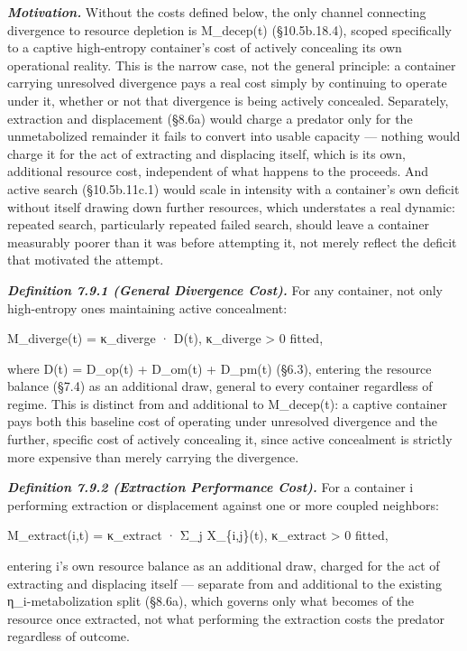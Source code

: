 \documentclass[
]{article}
\begin{document}
\emph{\textbf{Motivation.}} Without the costs defined below, the only
channel connecting divergence to resource depletion is M\_decep(t)
(§10.5b.18.4), scoped specifically to a captive high-entropy container's
cost of actively concealing its own operational reality. This is the
narrow case, not the general principle: a container carrying unresolved
divergence pays a real cost simply by continuing to operate under it,
whether or not that divergence is being actively concealed. Separately,
extraction and displacement (§8.6a) would charge a predator only for the
unmetabolized remainder it fails to convert into usable capacity ---
nothing would charge it for the act of extracting and displacing itself,
which is its own, additional resource cost, independent of what happens
to the proceeds. And active search (§10.5b.11c.1) would scale in
intensity with a container's own deficit without itself drawing down
further resources, which understates a real dynamic: repeated search,
particularly repeated failed search, should leave a container measurably
poorer than it was before attempting it, not merely reflect the deficit
that motivated the attempt.

\emph{\textbf{Definition 7.9.1 (General Divergence Cost).}} For any
container, not only high-entropy ones maintaining active concealment:

M\_diverge(t) = κ\_diverge · D(t), κ\_diverge \textgreater{} 0 fitted,

where D(t) = D\_op(t) + D\_om(t) + D\_pm(t) (§6.3), entering the
resource balance (§7.4) as an additional draw, general to every
container regardless of regime. This is distinct from and additional to
M\_decep(t): a captive container pays both this baseline cost of
operating under unresolved divergence and the further, specific cost of
actively concealing it, since active concealment is strictly more
expensive than merely carrying the divergence.

\emph{\textbf{Definition 7.9.2 (Extraction Performance Cost).}} For a
container i performing extraction or displacement against one or more
coupled neighbors:

M\_extract(i,t) = κ\_extract · Σ\_j X\_\{i,j\}(t), κ\_extract
\textgreater{} 0 fitted,

entering i's own resource balance as an additional draw, charged for the
act of extracting and displacing itself --- separate from and additional
to the existing η\_i-metabolization split (§8.6a), which governs only
what becomes of the resource once extracted, not what performing the
extraction costs the predator regardless of outcome.
\end{document}
